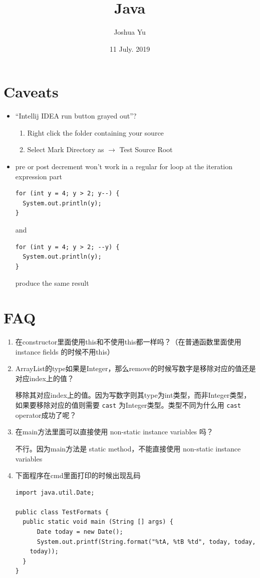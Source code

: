 \documentclass[a4paper, 12pt]{article}
\begin{document}

\large
\title{Java}
\author{Joshua Yu}
\date{11 July. 2019}
\maketitle
\tableofcontents


\section{Caveats}
\begin{itemize}
\item ``Intellij IDEA run button grayed out''?
\begin{enumerate}
\item Right click the folder containing your source
\item Select Mark Directory as $\rightarrow$ Test Source Root
\end{enumerate}

\item pre or post decrement won't work in a regular for loop at the iteration expression part
\begin{verbatim}
for (int y = 4; y > 2; y--) {
  System.out.println(y);
}
\end{verbatim}
and
\begin{verbatim}
for (int y = 4; y > 2; --y) {
  System.out.println(y);
}
\end{verbatim}
produce the same result

\end{itemize}


\section{FAQ}
\begin{enumerate}
\item 在constructor里面使用this和不使用this都一样吗？（在普通函数里面使用 instance fields 的时候不用this）

\item ArrayList的type如果是Integer，那么remove的时候写数字是移除对应的值还是对应index上的值？

移除其对应index上的值。因为写数字则其type为int类型，而非Integer类型，如果要移除对应的值则需要 \verb|cast| 为Integer类型。{\color{red}类型不同为什么用 \verb|cast| operator成功了呢？}

\item 在main方法里面可以直接使用 non-static instance variables 吗？

不行。因为main方法是 static method，不能直接使用 non-static instance variables

\item 下面程序在cmd里面打印的时候出现乱码
\begin{verbatim}
import java.util.Date;

public class TestFormats {
  public static void main (String [] args) {		
	  Date today = new Date();
	  System.out.printf(String.format("%tA, %tB %td", today, today, 
    today));
  }
}
\end{verbatim}

\end{enumerate}
\end{document}
